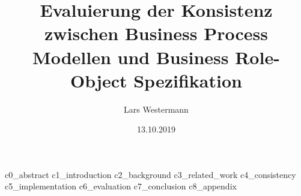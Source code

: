 \documentclass[ngerman]{tudscrreprt}
\begin{document}
\date{13.10.2019}
\author{Lars Westermann}
\title{Evaluierung der Konsistenz zwischen Business Process Modellen und Business Role-Object Spezifikation}
\supervisor{}
\maketitle

\tableofcontents

{c0_abstract}
{c1_introduction}
{c2_background}
{c3_related_work}
{c4_consistency}
{c5_implementation}
{c6_evaluation}
{c7_conclusion}
{c8_appendix}

\printbibliography
\end{document}
